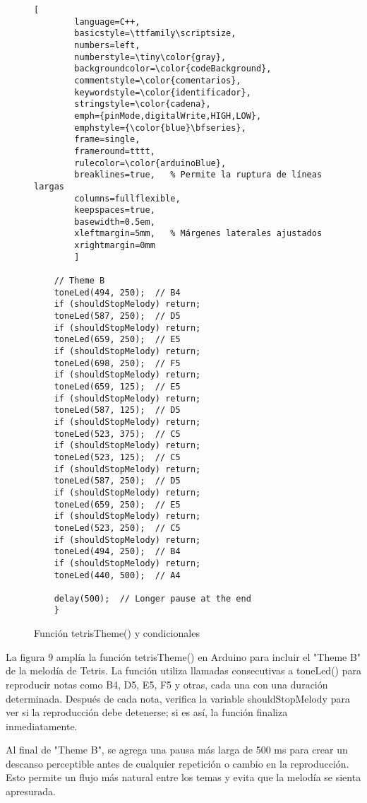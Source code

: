 
\setlength{\parindent}{0pt}
\setlength{\parskip}{6pt}
\begin{figure}[H]
	\centering
	\begin{lstlisting}[
		language=C++,
		basicstyle=\ttfamily\scriptsize,
		numbers=left,
		numberstyle=\tiny\color{gray},
		backgroundcolor=\color{codeBackground},
		commentstyle=\color{comentarios},
		keywordstyle=\color{identificador},
		stringstyle=\color{cadena},
		emph={pinMode,digitalWrite,HIGH,LOW},
		emphstyle={\color{blue}\bfseries},
		frame=single,
		frameround=tttt,
		rulecolor=\color{arduinoBlue},
		breaklines=true,   % Permite la ruptura de líneas largas
		columns=fullflexible,
		keepspaces=true,
		basewidth=0.5em,
		xleftmargin=5mm,   % Márgenes laterales ajustados
		xrightmargin=0mm
		]
		
	// Theme B
	toneLed(494, 250);  // B4
	if (shouldStopMelody) return;
	toneLed(587, 250);  // D5
	if (shouldStopMelody) return;
	toneLed(659, 250);  // E5
	if (shouldStopMelody) return;
	toneLed(698, 250);  // F5
	if (shouldStopMelody) return;
	toneLed(659, 125);  // E5
	if (shouldStopMelody) return;
	toneLed(587, 125);  // D5
	if (shouldStopMelody) return;
	toneLed(523, 375);  // C5
	if (shouldStopMelody) return;
	toneLed(523, 125);  // C5
	if (shouldStopMelody) return;
	toneLed(587, 250);  // D5
	if (shouldStopMelody) return;
	toneLed(659, 250);  // E5
	if (shouldStopMelody) return;
	toneLed(523, 250);  // C5
	if (shouldStopMelody) return;
	toneLed(494, 250);  // B4
	if (shouldStopMelody) return;
	toneLed(440, 500);  // A4
	
	delay(500);  // Longer pause at the end
	}
\end{lstlisting}
\caption{Función tetrisTheme() y condicionales}
\label{fig:codigo-led}
\end{figure}
La figura 9 amplía la función tetrisTheme() en Arduino para incluir el "Theme B" de la melodía de Tetris. La función utiliza llamadas consecutivas a toneLed() para reproducir notas como B4, D5, E5, F5 y otras, cada una con una duración determinada. Después de cada nota, verifica la variable shouldStopMelody para ver si la reproducción debe detenerse; si es así, la función finaliza inmediatamente.

Al final de "Theme B", se agrega una pausa más larga de 500 ms para crear un descanso perceptible antes de cualquier repetición o cambio en la reproducción. Esto permite un flujo más natural entre los temas y evita que la melodía se sienta apresurada.